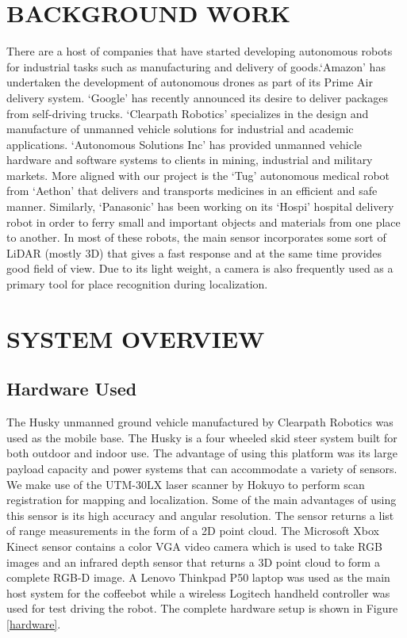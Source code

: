 \documentclass[letterpaper, 10 pt, conference]{ieeeconf}  %
\begin{document}
\section{BACKGROUND WORK}

There are a host of companies that have started developing autonomous robots for industrial tasks such as manufacturing and delivery of goods.\enquote*{Amazon} has undertaken the development of autonomous drones as part of its Prime Air delivery system. \enquote*{Google} has recently announced its desire to deliver packages from self-driving trucks. \enquote*{Clearpath Robotics} specializes in the design and manufacture of unmanned vehicle solutions for industrial and academic applications. \enquote*{Autonomous Solutions Inc} has provided unmanned vehicle hardware and software systems to clients in mining, industrial and military markets. More aligned with our project is the \enquote*{Tug} autonomous medical robot from \enquote*{Aethon} that delivers and transports medicines in an efficient and safe manner. Similarly, \enquote*{Panasonic} has been working on its \enquote*{Hospi} hospital delivery robot in order to ferry small and important objects and materials from one place to another. In most of these robots, the main sensor incorporates some sort of LiDAR (mostly 3D) that gives a fast response and at the same time provides good field of view. Due to its light weight, a camera is also frequently used as a primary tool for place recognition during localization.

\section{SYSTEM OVERVIEW}

\subsection{Hardware Used} 

The Husky unmanned ground vehicle manufactured by Clearpath Robotics was used as the mobile base. The Husky is a four wheeled skid steer system built for both outdoor and indoor use. The advantage of using this platform was its large payload capacity and power systems that can accommodate a variety of sensors. We make use of the UTM-30LX laser scanner by Hokuyo to perform scan registration for mapping and localization. Some of the main advantages of using this sensor is its high accuracy and angular resolution. The sensor returns a list of range measurements in the form of a 2D point cloud. The Microsoft Xbox Kinect sensor contains a color VGA video camera which is used to take RGB images and an infrared depth sensor that returns a 3D point cloud to form a complete RGB-D image. A Lenovo Thinkpad P50 laptop was used as the main host system for the coffeebot while a wireless Logitech handheld controller was used for test driving the robot. The complete hardware setup is shown in Figure \ref{hardware}. 
	
\end{document}
